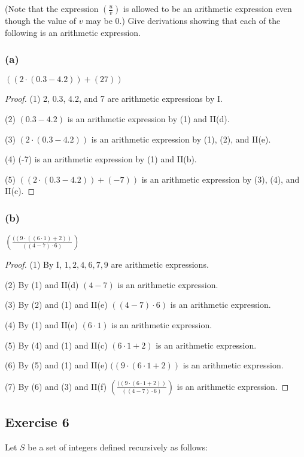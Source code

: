 \documentclass[14pt]{extarticle}
\newcommand{\dps}{\displaystyle}
\begin{document}
(Note that the expression \(\dps \left(\frac{u}{v}\right)\) is allowed to be an arithmetic expression even though the
value of $v$ may be 0.) Give derivations showing that each of the following is an arithmetic expression.

\subsubsection{(a)}
\(((2 \cdot (0.3 - 4.2)) + (27))\)

\begin{proof}
    (1) 2, 0.3, 4.2, and 7 are arithmetic expressions by I.

    (2) \((0.3 - 4.2)\) is an arithmetic expression by (1) and II(d).

    (3) \((2 \cdot (0.3 - 4.2))\) is an arithmetic expression by (1), (2), and II(e).

    (4) (-7) is an arithmetic expression by (1) and II(b).

    (5) \(((2 \cdot (0.3 - 4.2)) + (-7))\) is an arithmetic expression by (3), (4), and II(c).
\end{proof}

\subsubsection{(b)}
\(\dps \left( \frac{((9 \cdot ((6 \cdot 1) + 2))}{((4 - 7) \cdot 6)}\right)\)

\begin{proof}
    (1) By I, $1, 2, 4, 6, 7, 9$ are arithmetic expressions.

    (2) By (1) and II(d) \((4 - 7)\) is an arithmetic expression.

    (3) By (2) and (1) and II(e) \(((4 - 7) \cdot 6)\) is an arithmetic expression.

    (4) By (1) and II(e) \((6 \cdot 1)\) is an arithmetic expression.

    (5) By (4) and (1) and II(c) \((6 \cdot 1 + 2)\) is an arithmetic expression.

    (6) By (5) and (1) and II(e) \(((9 \cdot (6 \cdot 1 + 2))\) is an arithmetic expression.

    (7) By (6) and (3) and II(f) \(\dps \left( \frac{((9 \cdot (6 \cdot 1 + 2))}{((4 - 7) \cdot 6)}\right)\) is an
    arithmetic expression.
\end{proof}

\subsection{Exercise 6}
Let $S$ be a set of integers defined recursively as follows:
\end{document}
